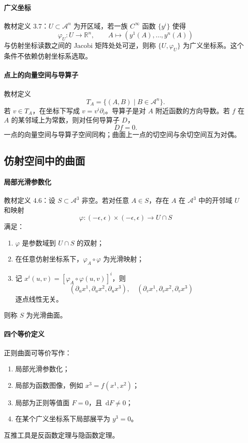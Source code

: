 \documentclass[UTF8,12pt,a4paper]{ctexart}
\newcommand{\A}{\mathcal A}
\newcommand{\R}{\mathbb R}
\newcommand{\dd}{\,\mathrm d}
\begin{document}
\paragraph{广义坐标}
教材定义 3.7：$U\subset\A^n$ 为开区域，若一族 $C^\infty$ 函数 $\{y^i\}$ 使得
\[
\varphi_U:U\to\R^n,\qquad A\mapsto(y^1(A),\ldots,y^n(A))
\]
与仿射坐标读数之间的 Jacobi 矩阵处处可逆，则称 $\{U,\varphi_U\}$ 为广义坐标系。这个条件不依赖仿射坐标系选取。

\paragraph{点上的向量空间与导算子}
教材定义
\[
T_A=\{(A,B)\mid B\in\A^n\}.
\]
若 $v\in T_A$，在坐标下写成 $v=v^i\partial_i$。导算子是对 $A$ 附近函数的方向导数。若 $f$ 在 $A$ 的某邻域上为常数，则对任何导算子 $D$，
\[
Df=0.
\]
一点的向量空间与导算子空间同构；曲面上一点的切空间与余切空间互为对偶。

\subsection{仿射空间中的曲面}
\paragraph{局部光滑参数化}
教材定义 4.6：设 $S\subset\A^3$ 非空。若对任意 $A\in S$，存在 $A$ 在 $\A^3$ 中的开邻域 $U$ 和映射
\[
\varphi:(-\epsilon,\epsilon)\times(-\epsilon,\epsilon)\to U\cap S
\]
满足：
\begin{enumerate}
\item $\varphi$ 是参数域到 $U\cap S$ 的双射；
\item 在任意仿射坐标系下，$\varphi_A\circ\varphi$ 为光滑映射；
\item 记 $x^i(u,v)=[\varphi_A\circ\varphi(u,v)]^i$，则
\[
(\partial_u x^1,\partial_u x^2,\partial_u x^3),\quad
(\partial_v x^1,\partial_v x^2,\partial_v x^3)
\]
逐点线性无关。
\end{enumerate}
则称 $S$ 为光滑曲面。

\paragraph{四个等价定义}
正则曲面可等价写作：
\begin{enumerate}
\item 局部光滑参数化；
\item 局部为函数图像，例如 $x^3=f(x^1,x^2)$；
\item 局部为正则等值面 $F=0$，且 $\dd F\ne0$；
\item 在某个广义坐标系下局部展平为 $y^3=0$。
\end{enumerate}
互推工具是反函数定理与隐函数定理。
\end{document}
